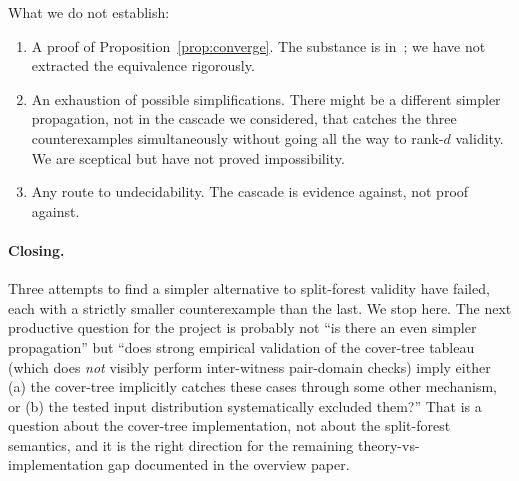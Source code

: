 \documentclass[11pt]{article}
\theoremstyle{definition}
\theoremstyle{remark}
\begin{document}
What we do not establish:
\begin{enumerate}
  \item A proof of Proposition~\ref{prop:converge}.  The substance
    is in~\cite{SplitForest}; we have not extracted the equivalence
    rigorously.
  \item An exhaustion of possible simplifications.  There might be
    a different simpler propagation, not in the cascade we
    considered, that catches the three counterexamples simultaneously
    without going all the way to rank-$d$ validity.  We are
    sceptical but have not proved impossibility.
  \item Any route to undecidability.  The cascade is evidence
    against, not proof against.
\end{enumerate}

\paragraph{Closing.}  Three attempts to find a simpler alternative
to split-forest validity have failed, each with a strictly smaller
counterexample than the last.  We stop here.  The next productive
question for the project is probably not ``is there an even simpler
propagation'' but ``does strong empirical validation of the
cover-tree tableau (which does \emph{not} visibly perform
inter-witness pair-domain checks) imply either (a) the cover-tree
implicitly catches these cases through some other mechanism, or
(b) the tested input distribution systematically excluded them?''
That is a question about the cover-tree implementation, not about
the split-forest semantics, and it is the right direction for the
remaining theory-vs-implementation gap documented in the overview
paper.
\end{document}
